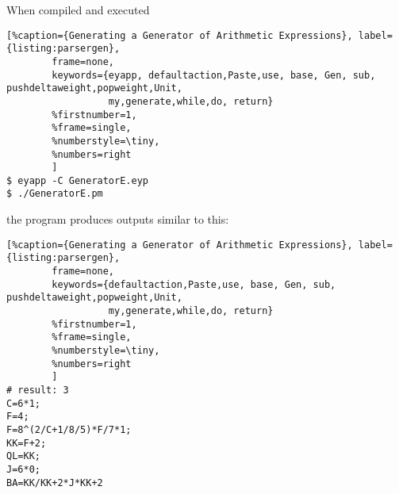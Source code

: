 When compiled and executed 
\begin{lstlisting}[%caption={Generating a Generator of Arithmetic Expressions}, label={listing:parsergen}, 
        frame=none,
        keywords={eyapp, defaultaction,Paste,use, base, Gen, sub, pushdeltaweight,popweight,Unit,
                  my,generate,while,do, return}
        %firstnumber=1, 
        %frame=single,
        %numberstyle=\tiny,
        %numbers=right
        ]
$ eyapp -C GeneratorE.eyp 
$ ./GeneratorE.pm 
\end{lstlisting}

the program produces
outputs similar to this:
\begin{lstlisting}[%caption={Generating a Generator of Arithmetic Expressions}, label={listing:parsergen}, 
        frame=none,
        keywords={defaultaction,Paste,use, base, Gen, sub, pushdeltaweight,popweight,Unit,
                  my,generate,while,do, return}
        %firstnumber=1, 
        %frame=single,
        %numberstyle=\tiny,
        %numbers=right
        ]
# result: 3
C=6*1;
F=4;
F=8^(2/C+1/8/5)*F/7*1;
KK=F+2;
QL=KK;
J=6*0;
BA=KK/KK+2*J*KK+2
\end{lstlisting}
